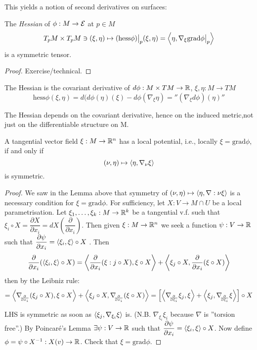 This yields a notion of second derivatives on surfaces:

\begin{definition}
	
	The \emph{Hessian} of $ \phi: M \rightarrow \mathcal E $ at $ p \in M $
		\[ T_pM \times T_pM \ni (\xi,\eta) \mapsto (\mathrm{hess} \phi)\big|_p(\xi,\eta) = \left \langle \eta,\nabla_\xi \mathrm{grad}\phi\big|_p  \right\rangle \]
	is a symmetric tensor.
	
\end{definition}

\begin{proof}
	Exercise/technical.
\end{proof}

\begin{remark}
	
	The Hessian is the covariant derivative of $ d\phi: M \times TM \rightarrow \mathbb R $, $ \xi,\eta: M \rightarrow TM $
		\[ \mathrm{hess}\phi(\xi,\eta) = d(d\phi(\eta)(\xi)-d\phi(\nabla_\xi\eta) = ''(\nabla_\xi d\phi)(\eta)'' \]	
\end{remark}

The Hessian depends on the covariant derivative, hence on the induced metric,not just on the differentiable structure on M.

\begin{lemma}
	A tangential vector field $ \xi: M \rightarrow \mathbb R^n $ has a local potential, i.e., locally $ \xi = \mathrm{grad}\phi $, if and only if	
		\[ (\nu,\eta) \mapsto \left \langle \eta, \nabla_\nu \xi \right\rangle \] is symmetric.
\end{lemma}

\begin{proof}
	
	We saw in the Lemma above that symmetry of $ (\nu,\eta) \mapsto \left \langle \eta,\nabla:\nu \xi \right\rangle $ is a necessary condition for $ \xi = \mathrm{grad}\phi. $
	For sufficiency, let $ X: V \rightarrow M \cap U $ be a local parametrisation. Let $ \xi_1, \dots, \xi_k : M \rightarrow \mathbb R^k$ be a tangential v.f. such that $ \xi_i \circ X = \dfrac{\partial X}{\partial x_i} = dX(\dfrac{\partial}{\partial x_i}) $.
	Then given $ \xi: M \rightarrow \mathbb R^n $ we seek a function $ \psi: V\rightarrow \mathbb R $ such that $ \dfrac{\partial \psi}{\partial x_i} = \left \langle \xi_i, \xi \right\rangle \circ X $ . Then
		\[ \dfrac{\partial}{\partial x_i}(\left \langle \xi_i, \xi \right\rangle \circ X) = \left \langle  \dfrac{\partial}{\partial x_i}(\xi:j \circ X), \xi \circ X \right\rangle+ \left \langle \xi_j \circ X, \dfrac{\partial}{\partial x_i}(\xi \circ X) \right\rangle \] then by the Leibniz rule:
		\[ =\skal{\D{x_i} (\xi_j \circ X), \xi \circ X} + \skal{\xi_j \circ X,\D{x_i} (\xi \circ X)}
		= \left[ \skal{\D{\xi_i}\xi_j , \xi} + \skal{\xi_j, \D{\xi_i}\xi} \right]\circ X \]
	
	LHS is symmetric as soon as $ \left \langle  \xi_j, \nabla_{\xi_i} \xi \right\rangle $ is.
	(N.B. $ \nabla_{\xi_i}\xi_i $ because $ \nabla $ is ''torsion free''.)
	By Poincaré's Lemma $ \exists \psi: V \rightarrow \mathbb R $ such that $ \dfrac{\partial \psi}{\partial x_i}= \left \langle \xi_i,\xi \right\rangle \circ X $.
	Now define $ \phi = \psi \circ X^{-1}: X(v) \rightarrow \mathbb R $. Check that $ \xi = \mathrm{grad}\phi $.
\end{proof}

